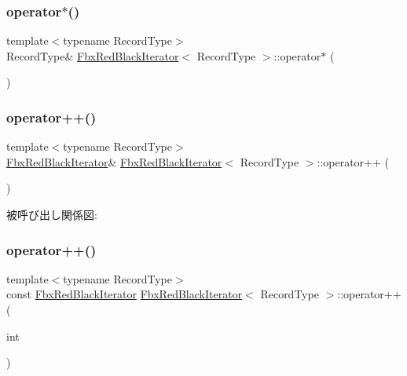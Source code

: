 \subsubsection{\texorpdfstring{operator$\ast$()}{operator*()}\hspace{0.1cm}{\footnotesize\ttfamily [2/2]}}
{\footnotesize\ttfamily template$<$typename Record\+Type$>$ \\
Record\+Type\& \hyperlink{class_fbx_red_black_iterator}{Fbx\+Red\+Black\+Iterator}$<$ Record\+Type $>$\+::operator$\ast$ (\begin{DoxyParamCaption}{ }\end{DoxyParamCaption})}

\mbox{\label{class_fbx_red_black_iterator_a1ea196cc2fcdc233f26ba205741c8d08}} 
\subsubsection{\texorpdfstring{operator++()}{operator++()}\hspace{0.1cm}{\footnotesize\ttfamily [1/2]}}
{\footnotesize\ttfamily template$<$typename Record\+Type$>$ \\
\hyperlink{class_fbx_red_black_iterator}{Fbx\+Red\+Black\+Iterator}\& \hyperlink{class_fbx_red_black_iterator}{Fbx\+Red\+Black\+Iterator}$<$ Record\+Type $>$\+::operator++ (\begin{DoxyParamCaption}{ }\end{DoxyParamCaption})}

被呼び出し関係図\+:
\mbox{\label{class_fbx_red_black_iterator_a58492d2dddc2067ca0cec9bd8348d2cd}} 
\subsubsection{\texorpdfstring{operator++()}{operator++()}\hspace{0.1cm}{\footnotesize\ttfamily [2/2]}}
{\footnotesize\ttfamily template$<$typename Record\+Type$>$ \\
const \hyperlink{class_fbx_red_black_iterator}{Fbx\+Red\+Black\+Iterator} \hyperlink{class_fbx_red_black_iterator}{Fbx\+Red\+Black\+Iterator}$<$ Record\+Type $>$\+::operator++ (\begin{DoxyParamCaption}\item[{int}]{ }\end{DoxyParamCaption})}

